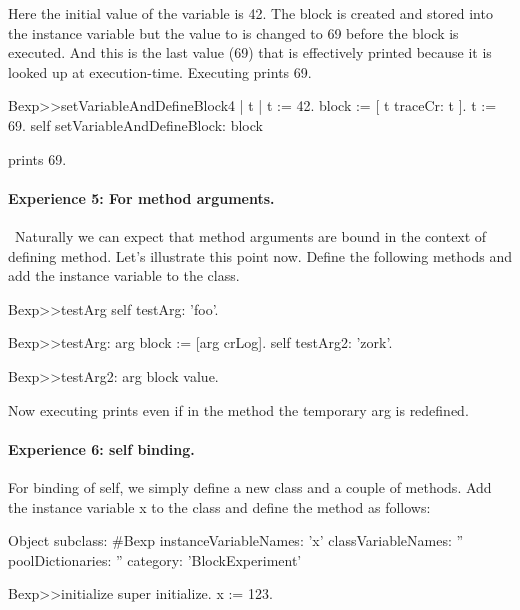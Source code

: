 \documentclass[a4paper,10pt,twoside]{book}
\begin{document}
Here the initial value of the variable  is 42. The block is created and stored into the instance variable  but the value to  is changed to 69 before the block is executed. And this is the last value (69) that is effectively printed because it is looked up at execution-time. Executing  prints 69.



\begin{code}{}
Bexp>>setVariableAndDefineBlock4
	| t |
	t := 42.
	block := [ t traceCr: t ].
	t := 69.
	self setVariableAndDefineBlock: block
\end{code}

 prints 69.





\paragraph{Experience 5: For method arguments.}\
Naturally we can expect that method arguments are bound in the context of defining method. Let's illustrate this point now. Define the following methods and add the instance variable  to the class.

\begin{code}{}
Bexp>>testArg
	self testArg: 'foo'.

Bexp>>testArg: arg
	block := [arg crLog].
	self testArg2: 'zork'.

Bexp>>testArg2: arg
	block value.
\end{code}

Now executing  prints  even if in the method  the temporary arg is redefined.

\paragraph{Experience 6: self binding.}
For binding of self, we simply define a new class and a couple of methods.
Add the instance variable x to the class \ct{Bexp} and define the  method as follows:

\begin{code}{}
Object subclass: #Bexp
	instanceVariableNames: 'x'
	classVariableNames: ''
	poolDictionaries: ''
	category: 'BlockExperiment'

Bexp>>initialize
    super initialize.
	x := 123.
\end{code}
\end{document}
